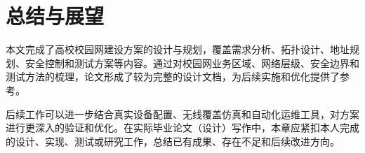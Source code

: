 \chapter{总结与展望}

本文完成了高校校园网建设方案的设计与规划，覆盖需求分析、拓扑设计、地址规划、安全控制和测试方案等内容。通过对校园网业务区域、网络层级、安全边界和测试方法的梳理，论文形成了较为完整的设计文档，为后续实施和优化提供了参考。

后续工作可以进一步结合真实设备配置、无线覆盖仿真和自动化运维工具，对方案进行更深入的验证和优化。在实际毕业论文（设计）写作中，本章应紧扣本人完成的设计、实现、测试或研究工作，总结已有成果、存在不足和后续改进方向。
